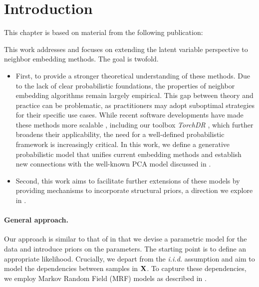 \section{Introduction}\label{intro}


This chapter is based on material from the following publication:

\begin{mdframed}
\begin{center} 
\end{center}
\end{mdframed}


This work addresses  and focuses on extending the latent variable perspective to neighbor embedding methods. The goal is twofold.

\begin{itemize}
    \item First, to provide a stronger theoretical understanding of these methods. Due to the lack of clear probabilistic foundations, the properties of neighbor embedding algorithms remain largely empirical. This gap between theory and practice can be problematic, as practitioners may adopt suboptimal strategies for their specific use cases.  
    While recent software developments have made these methods more scalable \citep{chan2018t,pezzotti2019gpgpu,linderman2019fast}, including our toolbox \emph{TorchDR} \citep{vanassel2024torchdr}, which further broadens their applicability, the need for a well-defined probabilistic framework is increasingly critical.  
    In this work, we define a generative probabilistic model that unifies current embedding methods and establish new connections with the well-known PCA model discussed in .
    \item Second, this work aims to facilitate further extensions of these models by providing mechanisms to incorporate structural priors, a direction we explore in .
\end{itemize}  

\paragraph{General approach.}
Our approach is similar to that of  in that we devise a parametric model for the data and introduce priors on the parameters. The starting point is to define an appropriate likelihood. Crucially, we depart from the \textit{i.i.d.} assumption and aim to model the dependencies between samples in ${\mathbf{X}}$. To capture these dependencies, we employ Markov Random Field (MRF) models as described in .

